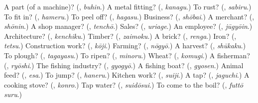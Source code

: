 \begin{tcolorbox}[breakable,colback=teal!4,colframe=teal!35!black,title={Before you move on}]
A part (of a machine)? (\textbf{}, \emph{buhin}.) A metal fitting? (\textbf{}, \emph{kanagu}.) To rust? (\textbf{}, \emph{sabiru}.) To fit in? (\textbf{}, \emph{hameru}.) To peel off? (\textbf{}, \emph{hagasu}.) Business? (\textbf{}, \emph{shōbai}.) A merchant? (\textbf{}, \emph{shōnin}.) A shop manager? (\textbf{}, \emph{tenchō}.) Sales? (\textbf{}, \emph{uriage}.) An employee? (\textbf{}, \emph{jūgyōin}.) Architecture? (\textbf{}, \emph{kenchiku}.) Timber? (\textbf{}, \emph{zaimoku}.) A brick? (\textbf{}, \emph{renga}.) Iron? (\textbf{}, \emph{tetsu}.) Construction work? (\textbf{}, \emph{kōji}.) Farming? (\textbf{}, \emph{nōgyō}.) A harvest? (\textbf{}, \emph{shūkaku}.) To plough? (\textbf{}, \emph{tagayasu}.) To ripen? (\textbf{}, \emph{minoru}.) Wheat? (\textbf{}, \emph{komugi}.) A fisherman? (\textbf{}, \emph{ryōshi}.) The fishing industry? (\textbf{}, \emph{gyogyō}.) A fishing boat? (\textbf{}, \emph{gyosen}.) Animal feed? (\textbf{}, \emph{esa}.) To jump? (\textbf{}, \emph{haneru}.) Kitchen work? (\textbf{}, \emph{suiji}.) A tap? (\textbf{}, \emph{jaguchi}.) A cooking stove? (\textbf{}, \emph{konro}.) Tap water? (\textbf{}, \emph{suidōsui}.) To come to the boil? (\textbf{}, \emph{futtō suru}.)
\end{tcolorbox}
